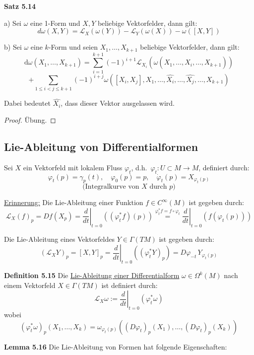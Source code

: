 \documentclass[fleqn, 12pt, letterpaper]{article}
\begin{document}
\textbf{Satz 5.14}

a) Sei \( \omega \) eine 1-Form und \( X, Y \) beliebige Vektorfelder, dann gilt:
\[
d\omega(X, Y)
= \mathcal{L}_X(\omega(Y))
- \mathcal{L}_Y(\omega(X))
- \omega([X, Y])
\]

b) Sei \( \omega \) eine \( k \)-Form und seien \( X_1, \dots, X_{k+1} \) beliebige Vektorfelder, dann gilt:
\[
\mathrm{d}\omega(X_1, \dots, X_{k+1}) =
\sum_{i=1}^{k+1} (-1)^{i+1} \mathcal{L}_{X_i}\left(\omega(X_1, \dots, \widehat{X_i}, \dots, X_{k+1})\right)
\]
\[+ \sum_{1 \le i < j \le k+1} (-1)^{i+j} \omega([X_i, X_j], X_1, \dots, \widehat{X_i}, \dots, \widehat{X_j}, \dots, X_{k+1})\]

Dabei bedeutet \( \widehat{X_i} \), dass dieser Vektor ausgelassen wird.

\begin{proof}
Übung.
\end{proof}

\subsection{Lie-Ableitung von Differentialformen}

Sei \( X \) ein Vektorfeld mit lokalem Fluss \( \varphi_t \), d.h.\ \( \varphi_t : U \subset M \to M \), definiert durch:
\[
\varphi_t(p) = \gamma_p(t), \quad \varphi_0(p) = p, \quad \dot{\varphi}_t(p) = X_{\varphi_t(p)}
\]
\[
\text{(Integral­kurve von } X \text{ durch } p)
\]

\underline{Erinnerung:} Die Lie-Ableitung einer Funktion \( f \in C^\infty(M) \) ist gegeben durch:
\[
\mathcal{L}_X(f)_p
= Df(X_p)
= \left. \frac{d}{dt} \right|_{t=0} \left( (\varphi_t^* f)(p) \right)
\overset{\varphi_t^*f=f\circ \varphi_t}{=} \left. \frac{d}{dt} \right|_{t=0} \left( f(\varphi_t(p)) \right)
\]

Die Lie-Ableitung eines Vektorfeldes \( Y \in \Gamma(TM) \) ist gegeben durch:
\[
(\mathcal{L}_X Y)_p
= [X, Y]_p
= \left. \frac{d}{dt} \right|_{t=0} \left( (\varphi_t^* Y)_p \right)
= D\varphi_{-t} \, Y_{\varphi_t(p)}
\]

\textbf{Definition 5.15}  
Die \underline{Lie-Ableitung einer Differentialform} \( \omega \in \Omega^k(M) \) nach einem Vektorfeld \( X \in \Gamma(TM) \) ist definiert durch:
\[
\mathcal{L}_X \omega := \left. \frac{d}{dt} \right|_{t=0} (\varphi_t^* \omega)
\]
wobei
\[
(\varphi_t^* \omega)_p(X_1, \dots, X_k) = \omega_{\varphi_t(p)}((D\varphi_t)_p(X_1), \dots, (D\varphi_t)_p(X_k))
\]

\textbf{Lemma 5.16}  
Die Lie-Ableitung von Formen hat folgende Eigenschaften:
\end{document}
